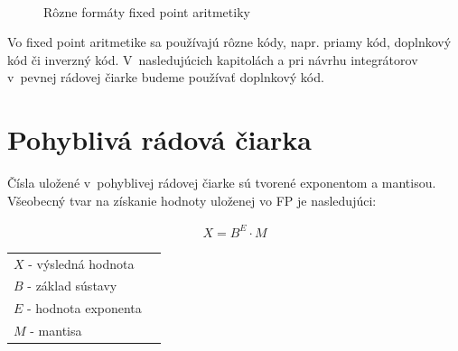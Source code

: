 \begin{figure}[h]
\centering
{} \hspace{0.6cm}
 \\ \bigskip
{} \hspace{1.2cm}
\caption{Rôzne formáty fixed point aritmetiky \cite{KrausDisP}}
\label{formatfixpoint}
\end{figure}
\bigskip

Vo fixed point aritmetike sa používajú rôzne kódy, napr. priamy kód, doplnkový kód či inverzný kód. V~nasledujúcich kapitolách a pri návrhu integrátorov v~pevnej rádovej čiarke budeme používať doplnkový kód. 

\newpage
\section{Pohyblivá rádová čiarka}
Čísla uložené v~pohyblivej rádovej čiarke sú tvorené exponentom a mantisou. Všeobecný tvar na získanie hodnoty uloženej vo FP je nasledujúci:

\begin{eqnarray}
X = B^{E}\cdot M
\end{eqnarray}

\begin{tabular}{ll}
$ X $ - výsledná hodnota \\
$ B $ - základ sústavy \\
$ E $ - hodnota exponenta \\
$ M $ - mantisa \\
\end{tabular}
\bigskip

